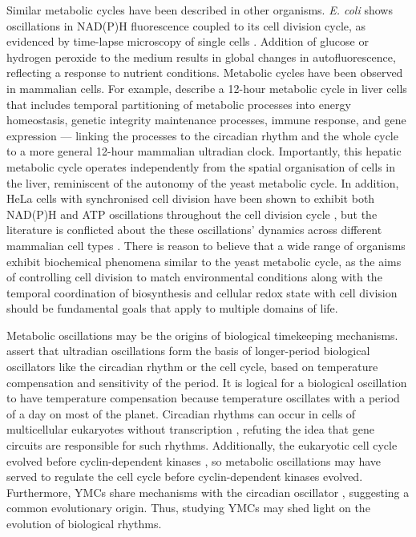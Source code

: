 Similar metabolic cycles have been described in other organisms.
\textit{E. coli} shows oscillations in NAD(P)H fluorescence coupled to its cell division cycle, as evidenced by time-lapse microscopy of single cells \parencite{zhangDynamicSinglecellNAD2018}.
Addition of glucose or hydrogen peroxide to the medium results in global changes in autofluorescence, reflecting a response to nutrient conditions.
Metabolic cycles have been observed in mammalian cells.
For example, \textcite{zhuLogicTemporalCompartmentalization2022} describe a 12-hour metabolic cycle in liver cells that includes temporal partitioning of metabolic processes into energy homeostasis, genetic integrity maintenance processes, immune response, and gene expression --- linking the processes to the circadian rhythm and the whole cycle to a more general 12-hour mammalian ultradian clock.
Importantly, this hepatic metabolic cycle operates independently from the spatial organisation of cells in the liver, reminiscent of the autonomy of the yeast metabolic cycle.
In addition, HeLa cells with synchronised cell division have been shown to exhibit both NAD(P)H and ATP oscillations throughout the cell division cycle \parencite{ahnTemporalFluxomicsReveals2017}, but the literature is conflicted about the these oscillations' dynamics across different mammalian cell types \parencite{zylstraMetabolicDynamicsCell2022}.
There is reason to believe that a wide range of organisms exhibit biochemical phenomena similar to the yeast metabolic cycle, as the aims of controlling cell division to match environmental conditions along with the temporal coordination of biosynthesis and cellular redox state with cell division should be fundamental goals that apply to multiple domains of life.

Metabolic oscillations may be the origins of biological timekeeping mechanisms.
\textcite{lloydRedoxRhythmicityClocks2007} assert that ultradian oscillations form the basis of longer-period biological oscillators like the circadian rhythm or the cell cycle, based on temperature compensation and sensitivity of the period.
It is logical for a biological oscillation to have temperature compensation because temperature oscillates with a period of a day on most of the planet.
Circadian rhythms can occur in cells of multicellular eukaryotes without transcription \parencite{oneillCircadianRhythmsPersist2011}, refuting the idea that gene circuits are responsible for such rhythms.
Additionally, the eukaryotic cell cycle evolved before cyclin-dependent kinases \parencite{papagiannakisAutonomousMetabolicOscillations2017}, so metabolic oscillations may have served to regulate the cell cycle before cyclin-dependent kinases evolved.
Furthermore, YMCs share mechanisms with the circadian oscillator \parencite{caustonMetabolicCyclesYeast2015,arataQuantitativeStudiesCellDivision2019}, suggesting a common evolutionary origin.
Thus, studying YMCs may shed light on the evolution of biological rhythms.

